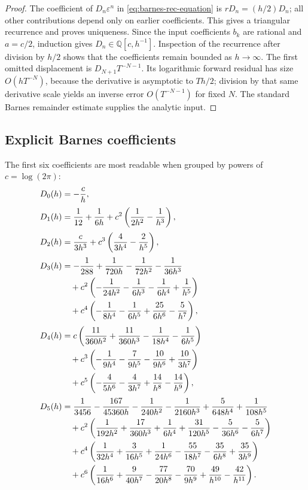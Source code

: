 \documentclass[11pt]{article}
\theoremstyle{definition}
\theoremstyle{remark}
\newcommand{\Q}{\mathbb Q}
\begin{document}
\begin{proof}
The coefficient of \(D_n\varepsilon^n\) in \cref{eq:barnes-rec-equation} is \(rD_n=(h/2)D_n\); all other contributions depend only on earlier coefficients.  This gives a triangular recurrence and proves uniqueness.  Since the input coefficients \(b_k\) are rational and \(a=c/2\), induction gives \(D_n\in\Q[c,h^{-1}]\).  Inspection of the recurrence after division by \(h/2\) shows that the coefficients remain bounded as \(h\to\infty\).  The first omitted displacement is \(D_{N+1}T^{-N-1}\).  Its logarithmic forward residual has size \(O(hT^{-N})\), because the derivative is asymptotic to \(Th/2\); division by that same derivative scale yields an inverse error \(O(T^{-N-1})\) for fixed \(N\).  The standard Barnes remainder estimate supplies the analytic input.
\end{proof}

\subsection{Explicit Barnes coefficients}

The first six coefficients are most readable when grouped by powers of
\(c=\log(2\pi)\):
\begin{align}
 D_0(h)&=-\frac{c}{h},\label{eq:D0}\\[0.2em]
 D_1(h)&=\frac1{12}+\frac1{6h}
 +c^2\left(\frac1{2h^2}-\frac1{h^3}\right),\label{eq:D1}\\[0.2em]
 D_2(h)&=\frac{c}{3h^3}
 +c^3\left(\frac{4}{3h^4}-\frac{2}{h^5}\right),\label{eq:D2}\\[0.2em]
 D_3(h)&=-\frac1{288}+\frac1{720h}-\frac1{72h^2}-\frac1{36h^3}\notag\\
 &\quad+c^2\left(-\frac1{24h^2}-\frac1{6h^3}-\frac1{6h^4}+\frac1{h^5}\right)\notag\\
 &\quad+c^4\left(-\frac1{8h^4}-\frac1{6h^5}
 +\frac{25}{6h^6}-\frac5{h^7}\right),\label{eq:D3}\\[0.2em]
 D_4(h)&=c\left(\frac{11}{360h^2}+\frac{11}{360h^3}
 -\frac1{18h^4}-\frac1{6h^5}\right)\notag\\
 &\quad+c^3\left(-\frac1{9h^4}-\frac7{9h^5}
 -\frac{10}{9h^6}+\frac{10}{3h^7}\right)\notag\\
 &\quad+c^5\left(-\frac4{5h^6}-\frac4{3h^7}
 +\frac{14}{h^8}-\frac{14}{h^9}\right),\label{eq:D4}\\[0.2em]
 D_5(h)&=\frac1{3456}-\frac{167}{45360h}-\frac1{240h^2}
 -\frac1{2160h^3}+\frac5{648h^4}+\frac1{108h^5}\notag\\
 &\quad+c^2\left(\frac1{192h^2}+\frac{17}{360h^3}
 +\frac1{6h^4}+\frac{31}{120h^5}
 -\frac5{36h^6}-\frac5{6h^7}\right)\notag\\
 &\quad+c^4\left(\frac1{32h^4}+\frac3{16h^5}+\frac1{24h^6}
 -\frac{55}{18h^7}-\frac{35}{6h^8}+\frac{35}{3h^9}\right)\notag\\
 &\quad+c^6\left(\frac1{16h^6}+\frac9{40h^7}-\frac{77}{20h^8}
 -\frac{70}{9h^9}+\frac{49}{h^{10}}-\frac{42}{h^{11}}\right).
 \label{eq:D5}
\end{align}
\end{document}
